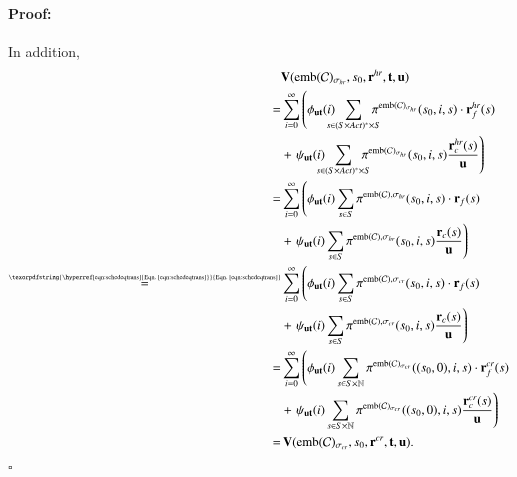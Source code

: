 \documentclass[10pt,twocolumn]{article}
\newenvironment{proof}{\paragraph{Proof:}}{\hfill$\square$}
\newcommand{\states} {{\ensuremath S}}
\newcommand{\state}  {{\ensuremath s}}
\newcommand{\nats}    {{\ensuremath {\mathbb{N}}}}
\newcommand{\acts}{\mathit{Act}}
\newcommand{\cmodel}{\mathcal{C}}
\newcommand{\urate}{\mathbf{u}}
\newcommand{\schedhr}{{\sigma_\mathit{hr}}}
\newcommand{\schedcr}{{\sigma_\mathit{cr}}}
\newcommand{\rew}{\mathbf{r}}
\newcommand{\frew}{\mathbf{r}_f}
\newcommand{\crew}{\mathbf{r}_c}
\newcommand{\timeb}{\mathbf{t}}
\newcommand{\mvalue}{\mathbf{V}}
\newcommand{\emb}{\mathrm{emb}}
\newcommand{\refseqn}[1]{\texorpdfstring{\hyperref[eqn:#1]{Eqn.~\ref*{eqn:#1}}}{Eqn.~\ref*{eqn:#1}}}
\newcommand{\tprob}{\pi}
\begin{document}
\begin{proof}
  In addition,
{\allowdisplaybreaks
  \begin{align}
      & \mvalue(\emb(\cmodel)_{\schedhr}, \state_0, \rew^{\mathit{hr}}, \timeb, \urate) \notag\\*
      = & \sum_{i=0}^\infty \left(\phi_{\urate \timeb}(i) \!\!\!\!\! \sum_{\state \in (\states\times\acts)^* \times \states} \!\!\!\!\! \tprob^{\emb(\cmodel)_{\schedhr}}(\state_0, i, \state) \cdot \frew^{\mathit{hr}}(\state)\right. \notag\\*
      & + \left.\psi_{\urate \timeb}(i) \!\!\!\!\! \sum_{\state \in (\states\times\acts)^* \times \states} \!\!\!\!\! \tprob^{\emb(\cmodel)_{\schedhr}}(\state_0, i, \state) \frac{\crew^{\mathit{hr}}(\state)}{\urate}\right) \notag\\
      = & \sum_{i=0}^\infty \left(\phi_{\urate \timeb}(i) \sum_{\state \in \states} \tprob^{\emb(\cmodel),{\schedhr}}(\state_0, i, \state) \cdot \frew(\state)\right. \notag\\*
      & + \left.\psi_{\urate \timeb}(i) \sum_{\state \in \states} \tprob^{\emb(\cmodel),{\schedhr}}(\state_0, i, \state) \frac{\crew(\state)}{\urate}\right) \label{eqn:mapscheds}\\
      \stackrel{\mbox{\tiny\refseqn{schedeqtrans}}}{=} &  \sum_{i=0}^\infty \left(\phi_{\urate \timeb}(i) \sum_{\state \in \states} \tprob^{\emb(\cmodel),{\schedcr}}(\state_0, i, \state) \cdot \frew(\state)\right. \notag\\*
      & + \left.\psi_{\urate \timeb}(i) \sum_{\state \in \states} \tprob^{\emb(\cmodel),{\schedcr}}(\state_0, i, \state) \frac{\crew(\state)}{\urate}\right) \notag\\
      = & \sum_{i=0}^\infty \left(\phi_{\urate \timeb}(i) \sum_{\state \in \states \times \nats} \tprob^{\emb(\cmodel)_{\schedcr}}((\state_0,0), i, \state) \cdot \frew^{\mathit{cr}}(\state)\right. \notag\\*
      & + \left.\psi_{\urate \timeb}(i) \sum_{\state \in \states \times \nats} \tprob^{\emb(\cmodel)_{\schedcr}}((\state_0,0), i, \state) \frac{\crew^{\mathit{cr}}(\state)}{\urate}\right) \notag\\
      = & \,\mvalue(\emb(\cmodel)_\schedcr, \state_0, \rew^{\mathit{cr}}, \timeb, \urate) .\notag
  \end{align}
  }
  

\end{proof}
\end{document}
